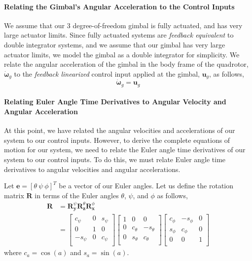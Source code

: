 \paragraph{Relating the Gimbal's Angular Acceleration to the Control Inputs}
We assume that our 3 degree-of-freedom gimbal is fully actuated, and has very large actuator limits. Since fully actuated systems are \emph{feedback equivalent} \cite{tedrake:2016} to double integrator systems, and we assume that our gimbal has very large actuator limits, we model the gimbal as a double integrator for simplicity. We relate the angular acceleration of the gimbal in the body frame of the quadrotor, $\dot{\mathbf{\omega}}_g$ to the \emph{feedback linearized} \cite{tedrake:2016} control input applied at the gimbal, $\mathbf{u}_g$, as follows,
%
\begin{equation}
\dot{\mathbf{\omega}}_g = \mathbf{u}_g
\label{eqn:ch2:u_g_short}
\end{equation}
%

\paragraph{Relating Euler Angle Time Derivatives to Angular Velocity and Angular Acceleration}

At this point, we have related the angular velocities and accelerations of our system to our control inputs.
However, to derive the complete equations of motion for our system, we need to relate the Euler angle time derivatives of our system to our control inputs.
To do this, we must relate Euler angle time derivatives to angular velocities and angular accelerations.

Let $\mathbf{e} = [ \theta ~ \psi ~ \phi ]^T$ be a vector of our Euler angles.
Let us define the rotation matrix $\mathbf{R}$ in terms of the Euler angles $\theta$, $\psi$, and $\phi$ as follows,
%
\begin{equation}
\begin{aligned}
%
\mathbf{R} & = \mathbf{R}_{\mathbf{y}}^{\psi} \mathbf{R}_{\mathbf{z}}^{\theta} \mathbf{R}_{\mathbf{x}}^{\phi} \\
& = 
\begin{bmatrix}
c_\psi  & 0 & s_\psi \\
0       & 1 & 0 \\
-s_\psi & 0 & c_\psi \\
\end{bmatrix}
\begin{bmatrix}
1 & 0        & 0 \\
0 & c_\theta & -s_\theta \\
0 & s_\theta & c_\theta \\
\end{bmatrix}
%
\begin{bmatrix}
c_\phi & -s_\phi & 0 \\
s_\phi & c_\phi  & 0 \\
0      & 0       & 1 \\
\end{bmatrix}
%
%
\end{aligned}
\end{equation}
%
where $c_a=\cos(a)$ and $s_a=\sin(a)$.

